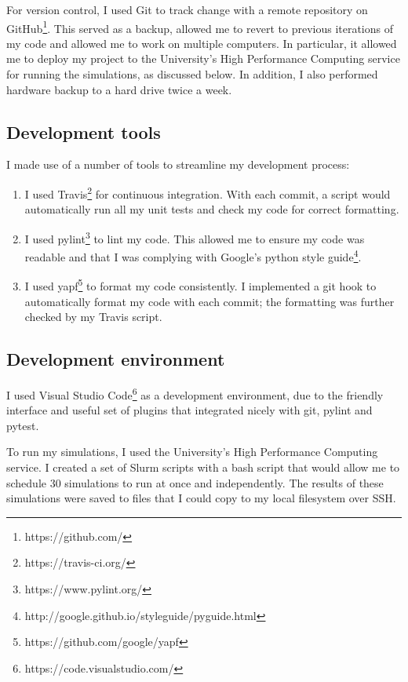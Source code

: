 \documentclass[12pt,a4paper,twoside,openright]{report}
\begin{document}
For version control, I used Git to track change with a remote repository on GitHub\footnote{https://github.com/}. This served as a backup, allowed me to revert to previous iterations of my code and allowed me to work on multiple computers. In particular, it allowed me to deploy my project to the University's High Performance Computing service for running the simulations, as discussed below. In addition, I also performed hardware backup to a hard drive twice a week.

\subsection{Development tools}

I made use of a number of tools to streamline my development process:

\begin{enumerate}
	\item I used Travis\footnote{https://travis-ci.org/} for continuous integration. With each commit, a script would automatically run all my unit tests and check my code for correct formatting.
	\item I used pylint\footnote{https://www.pylint.org/} to lint my code. This allowed me to ensure my code was readable and that I was complying with Google's python style guide\footnote{http://google.github.io/styleguide/pyguide.html}.
	\item I used yapf\footnote{https://github.com/google/yapf} to format my code consistently. I implemented a git hook to automatically format my code with each commit; the formatting was further checked by my Travis script.
\end{enumerate}

\subsection{Development environment}

I used Visual Studio Code\footnote{https://code.visualstudio.com/} as a development environment, due to the friendly interface and useful set of plugins that integrated nicely with git, pylint and pytest. 

To run my simulations, I used the University's High Performance Computing service. I created a set of Slurm scripts with a bash script that would allow me to schedule 30 simulations to run at once and independently. The results of these simulations were saved to files that I could copy to my local filesystem over SSH.
\end{document}
